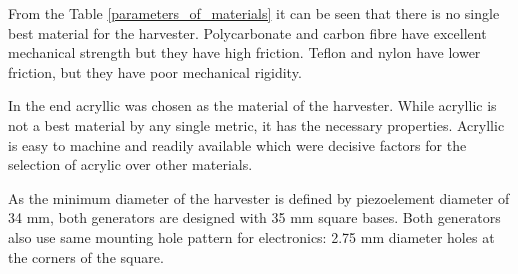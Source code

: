 \begin{table}[htb]
\caption{\label{parameters_of_materials} Materials for the shaft of the generator \cite{PlasticsInternational2015, Etra, Goodfellow, McCarr}.}
\begin{center}

\end{center}
\end{table}

From the Table \ref{parameters_of_materials} it can be seen that there is no single best material for the harvester. Polycarbonate and carbon fibre have excellent mechanical strength but they have high friction. Teflon and nylon have lower friction, but they have poor mechanical rigidity. 

In the end acryllic was chosen as the material of the harvester. While acryllic is not a best material by any single metric, it has the necessary properties. Acryllic is easy to machine and readily available which were decisive factors for the selection of acrylic over other materials. 

As the minimum diameter of the harvester is defined by piezoelement diameter of 34 mm, both generators are designed with 35 mm square bases. Both generators also use same mounting hole pattern for electronics: 2.75 mm diameter holes at the corners of the square.

